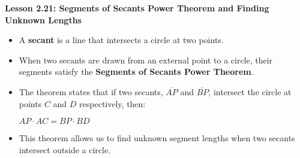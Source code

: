 \begin{center}
\textbf{Lesson 2.21: Segments of Secants Power Theorem and Finding Unknown Lengths}
\end{center}

\vspace*{-1.5ex}

\begin{itemize}
    \item A \textbf{secant} is a line that intersects a circle at two points.
    \item When two secants are drawn from an external point to a circle, their segments satisfy the \textbf{Segments of Secants Power Theorem}.
    \item The theorem states that if two secants, $\overline{AP}$ and $\overline{BP}$, intersect the circle at points $C$ and $D$ respectively, then:

{\centering $
    AP \cdot AC = BP \cdot BD
$\par}
    \item This theorem allows us to find unknown segment lengths when two secants intersect outside a circle.
\end{itemize}
